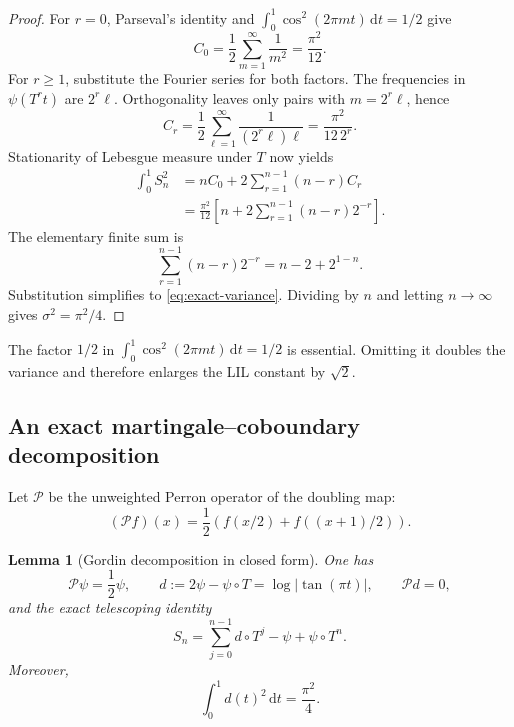 \documentclass[11pt,oneside]{article}
\numberwithin{equation}{section}
\newtheorem{lemma}[theorem]{Lemma}
\theoremstyle{definition}
\theoremstyle{remark}
\newcommand{\dd}{\,\mathrm d}
\newcommand{\abs}[1]{\left|#1\right|}
\newcommand{\Perron}{\mathcal P}
\newcommand{\defeq}{\mathrel{:=}}
\begin{document}
\begin{proof}
For \(r=0\), Parseval's identity and
\(\int_0^1\cos^2(2\pi mt)\dd t=1/2\) give
\[
 C_0=\frac12\sum_{m=1}^{\infty}\frac1{m^2}=\frac{\pi^2}{12}.
\]
For \(r\ge1\), substitute the Fourier series for both factors.  The frequencies in
\(\psi(T^rt)\) are \(2^r\ell\).  Orthogonality leaves only pairs with
\(m=2^r\ell\), hence
\[
 C_r=\frac12\sum_{\ell=1}^{\infty}
 \frac1{(2^r\ell)\ell}=\frac{\pi^2}{12\,2^r}.
\]
Stationarity of Lebesgue measure under \(T\) now yields
\begin{align*}
 \int_0^1S_n^2
 &=nC_0+2\sum_{r=1}^{n-1}(n-r)C_r\\
 &=\frac{\pi^2}{12}\left[n+2\sum_{r=1}^{n-1}(n-r)2^{-r}\right].
\end{align*}
The elementary finite sum is
\[
 \sum_{r=1}^{n-1}(n-r)2^{-r}=n-2+2^{1-n}.
\]
Substitution simplifies to \eqref{eq:exact-variance}.  Dividing by \(n\) and letting
\(n\to\infty\) gives \(\sigma^2=\pi^2/4\).
\end{proof}

\begin{pitfallbox}
The factor \(1/2\) in
\(\int_0^1\cos^2(2\pi mt)\dd t=1/2\) is essential.  Omitting it doubles the variance and
therefore enlarges the LIL constant by \(\sqrt2\).
\end{pitfallbox}

\subsection{An exact martingale--coboundary decomposition}

Let \(\Perron\) be the unweighted Perron operator of the doubling map:
\begin{equation}
 (\Perron f)(x)=\frac12\left(f(x/2)+f((x+1)/2)\right).
 \label{eq:Perron-unweighted}
\end{equation}

\begin{lemma}[Gordin decomposition in closed form]
\label{lem:Gordin}
One has
\begin{equation}
 \Perron\psi=\frac12\psi,
 \qquad
 d\defeq2\psi-\psi\circ T=\log\abs{\tan(\pi t)},
 \qquad
 \Perron d=0,
 \label{eq:d-def}
\end{equation}
and the exact telescoping identity
\begin{equation}
 S_n=\sum_{j=0}^{n-1}d\circ T^j-\psi+\psi\circ T^n.
 \label{eq:Gordin}
\end{equation}
Moreover,
\begin{equation}
 \int_0^1d(t)^2\dd t=\frac{\pi^2}{4}.
 \label{eq:d-variance}
\end{equation}
\end{lemma}
\end{document}
